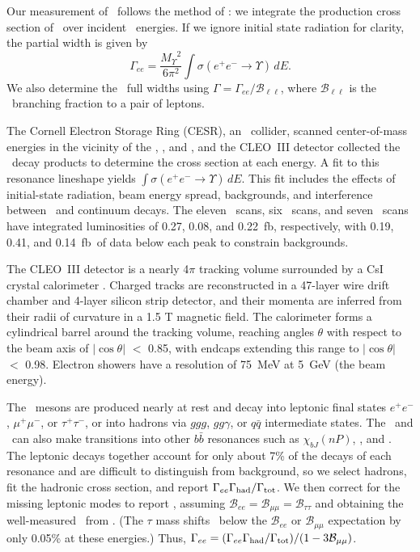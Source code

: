 \documentclass[aps,prd,preprint,superscriptaddress,tightenlines,nofootinbib]{revtex4}
\begin{document}
Our measurement of \gee\ follows the method of \cite{pdg}: we
integrate the production cross section of \ups\ over incident \ee\
energies.  If we ignore initial state radiation for clarity, the
partial width is given by
\begin{equation}
\label{eqn:gee}
\Gamma_{ee} = \frac{{M_\Upsilon}^2}{6\pi^2}\int \sigma(e^+e^- \to
\Upsilon) \, dE \mbox{.}
\end{equation}
We also determine the \ups\ full widths using $\Gamma =
\Gamma_{ee}/{\mathcal B}_{\ell\ell}$, where ${\mathcal B}_{\ell\ell}$
is the \ups\ branching fraction to a pair of leptons.

The Cornell Electron Storage Ring (CESR), an \ee\ collider, scanned
center-of-mass energies in the vicinity of the \us, \uss, and \usss,
and the CLEO~III detector collected the \ups\ decay products to
determine the cross section at each energy.  A fit to this resonance
lineshape yields $\int \sigma(e^+e^- \to \Upsilon) \, dE$.  This fit
includes the effects of initial-state radiation, beam energy spread,
backgrounds, and interference between \ups\ and continuum decays.  The
eleven \us\ scans, six \uss\ scans, and seven \usss\ scans have
integrated luminosities of 0.27, 0.08, and 0.22~fb\inv, respectively,
with 0.19, 0.41, and 0.14~fb\inv\ of data below each peak to constrain
backgrounds.

The CLEO~III detector is a nearly 4$\pi$ tracking volume surrounded by
a CsI crystal calorimeter \cite{cleoiii} \cite{driii}.  Charged tracks
are reconstructed in a 47-layer wire drift chamber and 4-layer silicon
strip detector, and their momenta are inferred from their radii of
curvature in a 1.5 T magnetic field.  The calorimeter forms a
cylindrical barrel around the tracking volume, reaching angles
$\theta$ with respect to the beam axis of $|\cos\theta|$ $<$ 0.85,
with endcaps extending this range to $|\cos\theta|$ $<$ 0.98.
Electron showers have a resolution of 75~MeV at 5~GeV (the beam
energy).

The \ups\ mesons are produced nearly at rest and decay into leptonic
final states $e^+e^-$, $\mu^+\mu^-$, or $\tau^+\tau^-$, or into
hadrons via $ggg$, $gg\gamma$, or $q\bar{q}$ intermediate states.  The
\uss\ and \usss\ can also make transitions into other $b\bar{b}$
resonances such as $\chi_{bJ}(nP)$, \us, and \uss.  The leptonic
decays together account for only about 7\% of the decays of each
resonance and are difficult to distinguish from background, so we
select hadrons, fit the hadronic cross section, and report
$\Gamma_{ee}\Gamma_{\mbox{\scriptsize had}}/\Gamma_{\mbox{\scriptsize tot}}$.  We then correct for the missing leptonic modes to
report \gee, assuming ${\mathcal B}_{ee} = {\mathcal B}_{\mu\mu} =
{\mathcal B}_{\tau\tau}$ and obtaining the well-measured \bmm\ from
\cite{istvan}.  (The $\tau$ mass shifts \btt\ below the ${\mathcal
B}_{ee}$ or ${\mathcal B}_{\mu\mu}$ expectation by only 0.05\% at
these energies.)  Thus, $\Gamma_{ee} = (\Gamma_{ee}\Gamma_{\mbox{\scriptsize had}}/\Gamma_{\mbox{\scriptsize tot}})/(1 - 3{\mathcal
B}_{\mu\mu})$.
\end{document}

